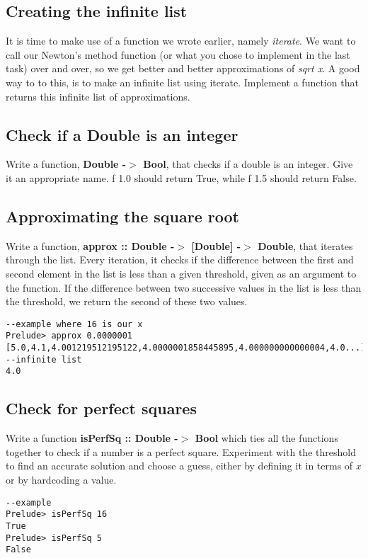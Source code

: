 \documentclass{article}
\begin{document}
\subsection{Creating the infinite list}
It is time to make use of a function we wrote earlier, namely \textit{iterate}. We want to call our Newton's method function (or what you chose to implement in the last task) over and over, so we get better and better approximations of \textit{sqrt x}. A good way to to this, is to make an infinite list using iterate. Implement a function that returns this infinite list of approximations.

\subsection{Check if a Double is an integer}
Write a function, \textbf{Double -$>$ Bool}, that checks if a double is an integer. Give it an appropriate name. f 1.0 should return True, while f 1.5 should return False.

\subsection{Approximating the square root}
Write a function, \textbf{approx :: Double -$>$ [Double] -$>$ Double}, that iterates through the list. Every iteration, it checks if the difference between the first and second element in the list is less than a given threshold, given as an argument to the function. If the difference between two successive values in the list is less than the threshold, we return the second of these two values.
\begin{lstlisting}
--example where 16 is our x
Prelude> approx 0.0000001 [5.0,4.1,4.001219512195122,4.0000001858445895,4.000000000000004,4.0...] --infinite list
4.0
\end{lstlisting}

\subsection{Check for perfect squares}
Write a function \textbf{isPerfSq :: Double -$>$ Bool} which ties all the functions together to check if a number is a perfect square. Experiment with the threshold to find an accurate solution and choose a guess, either by defining it in terms of \textit{x} or by hardcoding a value.
\begin{lstlisting}
--example
Prelude> isPerfSq 16
True
Prelude> isPerfSq 5
False
\end{lstlisting}
\end{document}
